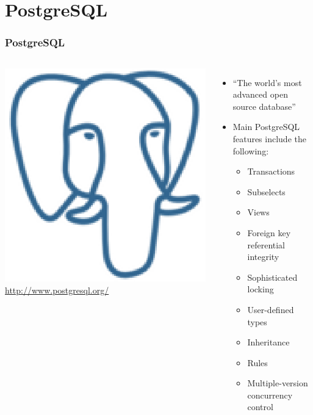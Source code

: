 \documentclass{beamer}
\begin{document}
\section{PostgreSQL}
\begin{frame}[fragile]
\frametitle{PostgreSQL}

\begin{columns}
\href{http://www.postgresql.org/}{\includegraphics[width=0.75 \textwidth]{postgreSQL300x300.eps}}
 \url{http://www.postgresql.org/}
\begin{itemize}
  \item ``The world's most advanced open source database''
  \item Main PostgreSQL features include the following:
  \begin{itemize}
    \item Transactions
    \item Subselects
    \item Views
    \item Foreign key referential integrity
    \item Sophisticated locking
    \item User-defined types
    \item Inheritance
    \item Rules
    \item Multiple-version concurrency control
  \end{itemize}

\end{itemize}
\end{columns}
\end{frame}
\end{document}
